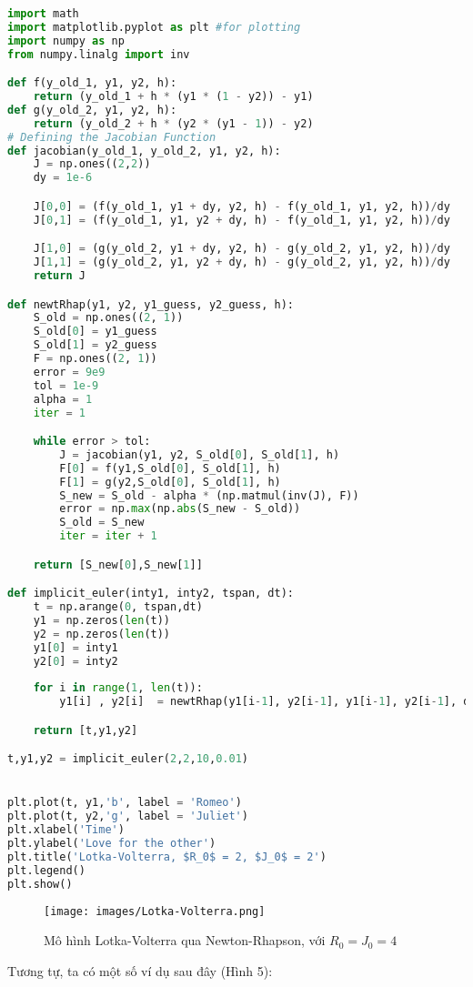 \documentclass[a4paper]{article}
\begin{document}
    \begin{lstlisting}[language=Python]
import math 
import matplotlib.pyplot as plt #for plotting
import numpy as np 
from numpy.linalg import inv

def f(y_old_1, y1, y2, h):
    return (y_old_1 + h * (y1 * (1 - y2)) - y1)
def g(y_old_2, y1, y2, h):
    return (y_old_2 + h * (y2 * (y1 - 1)) - y2)
# Defining the Jacobian Function
def jacobian(y_old_1, y_old_2, y1, y2, h):
    J = np.ones((2,2))
    dy = 1e-6

    J[0,0] = (f(y_old_1, y1 + dy, y2, h) - f(y_old_1, y1, y2, h))/dy
    J[0,1] = (f(y_old_1, y1, y2 + dy, h) - f(y_old_1, y1, y2, h))/dy

    J[1,0] = (g(y_old_2, y1 + dy, y2, h) - g(y_old_2, y1, y2, h))/dy
    J[1,1] = (g(y_old_2, y1, y2 + dy, h) - g(y_old_2, y1, y2, h))/dy 
    return J

def newtRhap(y1, y2, y1_guess, y2_guess, h):
	S_old = np.ones((2, 1))
	S_old[0] = y1_guess
	S_old[1] = y2_guess
	F = np.ones((2, 1))
	error = 9e9
	tol = 1e-9
	alpha = 1
	iter = 1

	while error > tol:
		J = jacobian(y1, y2, S_old[0], S_old[1], h)
		F[0] = f(y1,S_old[0], S_old[1], h) 
		F[1] = g(y2,S_old[0], S_old[1], h)
		S_new = S_old - alpha * (np.matmul(inv(J), F))
		error = np.max(np.abs(S_new - S_old))
		S_old = S_new
		iter = iter + 1

	return [S_new[0],S_new[1]] 

def implicit_euler(inty1, inty2, tspan, dt):
	t = np.arange(0, tspan,dt)
	y1 = np.zeros(len(t))
	y2 = np.zeros(len(t))
	y1[0] = inty1
	y2[0] = inty2
	
	for i in range(1, len(t)):
		y1[i] , y2[i]  = newtRhap(y1[i-1], y2[i-1], y1[i-1], y2[i-1], dt)

	return [t,y1,y2]

t,y1,y2 = implicit_euler(2,2,10,0.01)


plt.plot(t, y1,'b', label = 'Romeo')
plt.plot(t, y2,'g', label = 'Juliet')
plt.xlabel('Time')
plt.ylabel('Love for the other')
plt.title('Lotka-Volterra, $R_0$ = 2, $J_0$ = 2')
plt.legend()
plt.show()
     \end{lstlisting}
    \begin{figure}
        \centering
        \texttt{[image: images/Lotka-Volterra.png]}
        \caption{Mô hình Lotka-Volterra qua Newton-Rhapson, với $R_0 = J_0 = 4$} 
    \end{figure}
    Tương tự, ta có một số ví dụ sau đây (Hình 5): \\
\end{document}
